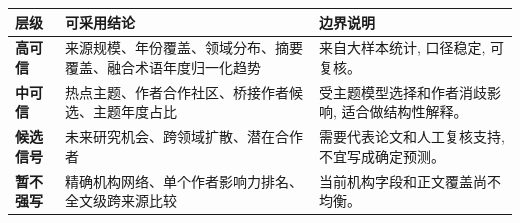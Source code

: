 \begin{tableblock}
\begin{tabularx}{\textwidth}{>{\bfseries}p{30mm}X X}
\toprule
层级 & 可采用结论 & 边界说明 \\
\midrule
高可信 & 来源规模、年份覆盖、领域分布、摘要覆盖、融合术语年度归一化趋势 & 来自大样本统计, 口径稳定, 可复核。 \\
中可信 & 热点主题、作者合作社区、桥接作者候选、主题年度占比 & 受主题模型选择和作者消歧影响, 适合做结构性解释。 \\
候选信号 & 未来研究机会、跨领域扩散、潜在合作者 & 需要代表论文和人工复核支持, 不宜写成确定预测。 \\
暂不强写 & 精确机构网络、单个作者影响力排名、全文级跨来源比较 & 当前机构字段和正文覆盖尚不均衡。 \\
\bottomrule
\end{tabularx}
\end{tableblock}

\clearpage
